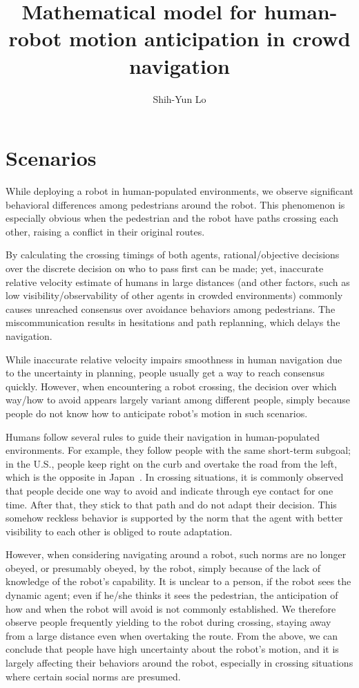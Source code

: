\documentclass{article}
\title{Mathematical model for human-robot motion anticipation in crowd navigation}
\author{Shih-Yun Lo}
\begin{document}
\maketitle

\section{Scenarios}
While deploying a robot in human-populated environments, we observe significant behavioral differences among pedestrians around the robot. This phenomenon is especially obvious when the pedestrian and the robot have paths crossing each other, raising a conflict in their original routes. 

By calculating the crossing timings of both agents, rational/objective decisions over the discrete decision on who to pass first can be made; yet, inaccurate relative velocity estimate of humans in large distances (and other factors, such as low visibility/observability of other agents in crowded environments) commonly causes unreached consensus over avoidance behaviors among pedestrians. The miscommunication results in hesitations and path replanning, which delays the navigation.

While inaccurate relative velocity impairs smoothness in human navigation due to the uncertainty in planning, people usually get a way to reach consensus quickly. However, when encountering a robot crossing, the decision over which way/how to avoid appears largely variant among different people, simply because people do not know how to anticipate robot's motion in such scenarios.

Humans follow several rules to guide their navigation in human-populated environments. For example, they follow people with the same short-term subgoal; in the U.S., people keep right on the curb and overtake the road from the left, which is the opposite in Japan~\cite{zanlungo2012microscopic}. In crossing situations, it is commonly observed that people decide one way to avoid and indicate through eye contact for one time. After that, they stick to that path and do not adapt their decision. This somehow reckless behavior is supported by the norm that the agent with better visibility to each other is obliged to route adaptation.

However, when considering navigating around a robot, such norms are no longer obeyed, or presumably obeyed, by the robot, simply because of the lack of knowledge of the robot's capability. It is unclear to a person, if the robot sees the dynamic agent; even if he/she thinks it sees the pedestrian, the anticipation of how and when the robot will avoid is not commonly established. We therefore observe people frequently yielding to the robot during crossing, staying away from a large distance even when overtaking the route. From the above, we can conclude that people have high uncertainty about the robot's motion, and it is largely affecting their behaviors around the robot, especially in crossing situations where certain social norms are presumed.
\end{document}
